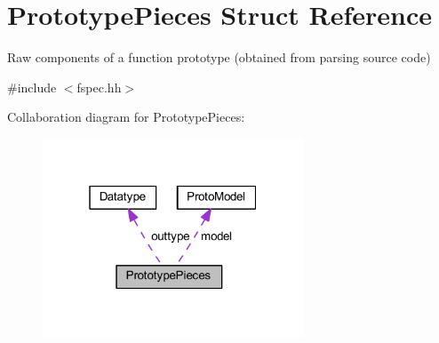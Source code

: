 \hypertarget{struct_prototype_pieces}{}\section{Prototype\+Pieces Struct Reference}
\label{struct_prototype_pieces}


Raw components of a function prototype (obtained from parsing source code)  




{\ttfamily \#include $<$fspec.\+hh$>$}



Collaboration diagram for Prototype\+Pieces\+:
\nopagebreak
\begin{figure}[H]
\begin{center}
\leavevmode
\includegraphics[width=220pt]{struct_prototype_pieces__coll__graph}
\end{center}
\end{figure}
